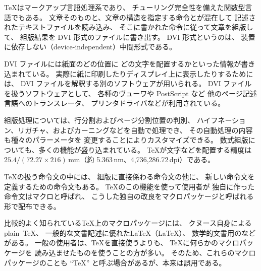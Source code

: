 \documentclass{jsarticle}
\begin{document}
\TeX はマークアップ言語処理系であり、
チューリング完全性を備えた関数型言語でもある。
文章そのものと、文章の構造を指定する命令とが混在して
記述されたテキストファイルを読み込み、
そこに書かれた命令に従って文章を組版して、
組版結果を DVI 形式のファイルに書き出す。
DVI 形式というのは、
装置に依存しない（device-independent）中間形式である。

DVI ファイルには紙面のどの位置に
どの文字を配置するかといった情報が書き込まれている。
実際に紙に印刷したりディスプレイ上に表示したりするためには、
DVI ファイルを解釈する別のソフトウェアが用いられる。
DVI ファイルを扱うソフトウェアとして、
各種のヴューワや PostScript など
他のページ記述言語へのトランスレータ、
プリンタドライバなどが利用されている。

組版処理については、行分割およびページ分割位置の判別、
ハイフネーション、リガチャ、およびカーニングなどを自動で処理でき、
その自動処理の内容も種々のパラーメータを
変更することによりカスタマイズできる。
数式組版についても、多くの機能が盛り込まれている。
\TeX が文字などを配置する精度は 
$25.4/(72.27 \times 216)$\,mm（約 5.363\,nm、4,736,286.72\,dpi）である。

\TeX の扱う命令文の中には、
組版に直接係わる命令文の他に、
新しい命令文を定義するための命令文もある。
\TeX のこの機能を使って使用者が
独自に作った命令文はマクロと呼ばれ、
こうした独自の改良をマクロパッケージと呼ばれる形で配布できる。

比較的よく知られている\TeX 上のマクロパッケージには、
クヌース自身によるplain~\TeX、
一般的な文書記述に優れた\LaTeX（LaTeX）、
数学的文書用の\AmSTeX などがある。
一般の使用者は、\TeX を直接使うよりも、
\TeX に何らかのマクロパッケージを
読み込ませたものを使うことの方が多い。
そのため、これらのマクロパッケージのことも
``\TeX'' と呼ぶ場合があるが、本来は誤用である。
\end{document}
